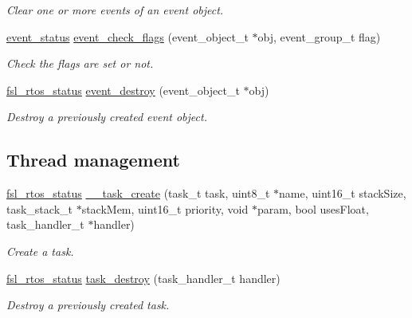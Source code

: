 \begin{DoxyCompactItemize}
\begin{DoxyCompactList}\small\item\em Clear one or more events of an event object. \end{DoxyCompactList}\item 
\hyperlink{group__os__abstraction_gae67760ac28a08088a73d7ccef40217e6}{event\+\_\+status} \hyperlink{group__os__abstraction_ga3846d26bcfb744193a48d46e90094395}{event\+\_\+check\+\_\+flags} (event\+\_\+object\+\_\+t $\ast$obj, event\+\_\+group\+\_\+t flag)
\begin{DoxyCompactList}\small\item\em Check the flags are set or not. \end{DoxyCompactList}\item 
\hyperlink{group__os__abstraction_gaea1a100f413fd124de281c4b493e99d5}{fsl\+\_\+rtos\+\_\+status} \hyperlink{group__os__abstraction_ga892f954126570081239bf5fdfd06e009}{event\+\_\+destroy} (event\+\_\+object\+\_\+t $\ast$obj)
\begin{DoxyCompactList}\small\item\em Destroy a previously created event object. \end{DoxyCompactList}\end{DoxyCompactItemize}
\subsection*{Thread management}
\begin{DoxyCompactItemize}
\item 
\hyperlink{group__os__abstraction_gaea1a100f413fd124de281c4b493e99d5}{fsl\+\_\+rtos\+\_\+status} \hyperlink{group__os__abstraction_ga9fcc93a6fb841c83b2f85db38f23708b}{\+\_\+\+\_\+task\+\_\+create} (task\+\_\+t task, uint8\+\_\+t $\ast$name, uint16\+\_\+t stack\+Size, task\+\_\+stack\+\_\+t $\ast$stack\+Mem, uint16\+\_\+t priority, void $\ast$param, bool uses\+Float, task\+\_\+handler\+\_\+t $\ast$handler)
\begin{DoxyCompactList}\small\item\em Create a task. \end{DoxyCompactList}\item 
\hyperlink{group__os__abstraction_gaea1a100f413fd124de281c4b493e99d5}{fsl\+\_\+rtos\+\_\+status} \hyperlink{group__os__abstraction_gaf22a7931c6a46015c50521a72b8673d3}{task\+\_\+destroy} (task\+\_\+handler\+\_\+t handler)
\begin{DoxyCompactList}\small\item\em Destroy a previously created task. \end{DoxyCompactList}\end{DoxyCompactItemize}
